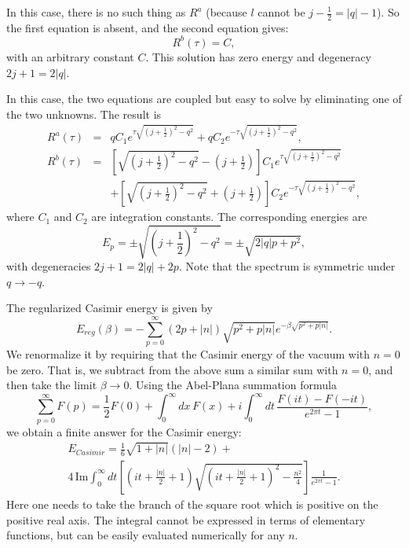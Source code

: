 \documentclass[a4paper,12pt, amsfonts, amssymb]{article}
\newcommand{\ra}{\rightarrow}
\begin{document}

In this case, there is no such thing as $R^a$ (because $l$ cannot be 
$j-\frac{1}{2}=|q|-1$). So the first equation is absent, and the 
second equation gives:
$$
R^b(\tau)=C,
$$
with an arbitrary constant $C$. This solution has zero energy 
and degeneracy $2j+1=2|q|$.


In this case, the two equations are coupled but easy to solve by 
eliminating one of the two unknowns. The result is
\begin{eqnarray}
R^a(\tau)&=&q C_1e^{\tau\sqrt{\left(j+\frac{1}{2}\right)^2-q^2}} 
+q C_2e^{-\tau\sqrt{\left(j+\frac{1}{2}\right)^2-q^2}},\nonumber\\
R^b(\tau)&=&\left[\sqrt{\left(j+\frac{1}{2}\right)^2-q^2}
-\left(j+\frac{1}{2}\right)\right]
C_1e^{\tau\sqrt{\left(j+\frac{1}{2}\right)^2-q^2}}\nonumber\\
&&+\left[\sqrt{\left(j+\frac{1}{2}\right)^2-q^2}+\left(j+\frac{1}{2}\right)
\right]C_2e^{-\tau\sqrt{\left(j+\frac{1}{2}\right)^2-q^2}},\nonumber
\end{eqnarray}
where $C_1$ and $C_2$ are integration constants.
The corresponding energies are 
$$
E_p=\pm\sqrt{\left(j+\frac12\right)^2-q^2}=\pm\sqrt{2|q|p+p^2},
$$
with degeneracies $2j+1=2|q|+2p$. Note that the spectrum is symmetric
under $q\to -q$.

The regularized Casimir energy is given by
$$
E_{reg}(\beta)=-\sum_{p=0}^\infty (2p+|n|)\sqrt{p^2+p|n|}
e^{-\beta\sqrt{p^2+p|n|}}.
$$
We renormalize it by requiring that the Casimir energy of the vacuum with
$n=0$ be zero. That is, we subtract from the above sum a similar sum
with $n=0$, and then take the limit $\beta\ra 0$.
Using the Abel-Plana summation formula
$$
\sum_{p=0}^\infty F(p)=\frac12 F(0)+\int^\infty_0 dx\, F(x)+
i\int^\infty_0 dt\, \frac{F(it)-F(-it)}{e^{2\pi t}-1},
$$
we obtain a finite answer for the Casimir energy:
\begin{multline}
E_{Casimir}=\frac16 \sqrt{1+|n|}(|n|-2)
+\\
4\,\textrm{Im}\int^\infty_0 dt\phantom{}
\left[ \left(it+\frac{|n|}{2}+1\right)\sqrt{\left(it+\frac{|n|}{2}+1\right)^2-
\frac{n^2}{4}}\right]\frac{1}{e^{2\pi t}-1}.\nonumber
\end{multline}
Here one needs to take the branch of the square root which is positive on the
positive real axis. The integral cannot be expressed in terms of elementary functions, but can be easily evaluated numerically for any $n$.
\end{document}
